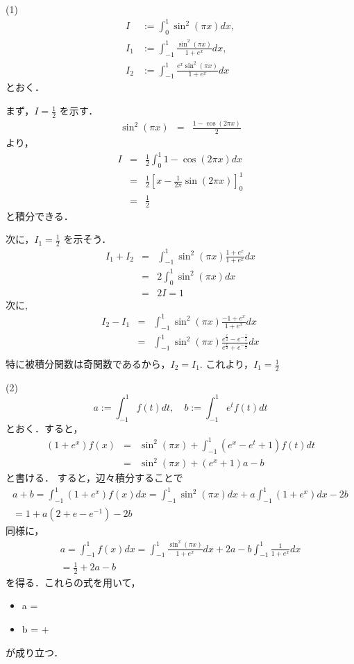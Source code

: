 \documentclass[main]{subfiles}
\begin{document}
\begin{pf}
(1) 
\begin{eqnarray*}
I &:= \int^1_0\sin^2(\pi x) dx, \\
I_1 &:= \int^1_{-1}\frac{\sin^2(\pi x)}{1+e^x}dx, \\
I_2 &:= \int^1_{-1}\frac{e^x\sin^2(\pi x)}{1+e^x}dx
\end{eqnarray*}
とおく．

まず，$I = \frac{1}{2}$ を示す．
\begin{eqnarray*}
\sin^2(\pi x) &=& \frac{1-\cos(2\pi x)}{2}
\end{eqnarray*}
より，
\begin{eqnarray*}
I &=& \frac{1}{2}\int^1_0 1-\cos(2\pi x)dx \\
	&=& \frac{1}{2}[x-\frac{1}{2\pi}\sin(2\pi x)]^1_0 \\
	&=& \frac{1}{2}
\end{eqnarray*}
と積分できる．

次に，$I_1 = \frac{1}{2}$ を示そう．
\begin{eqnarray*}
I_1 + I_2 &=& \int^1_{-1}\sin^2(\pi x) \frac{1+e^x}{1+e^x}dx \\
			&=& 2\int^1_0\sin^2(\pi x)dx \\
			&=& 2I = 1
\end{eqnarray*}
次に, 
\begin{eqnarray*}
I_2 -I_1 &=& \int^1_{-1}\sin^2(\pi x) \frac{-1+e^x}{1+e^x}dx \\
&=& \int^1_{-1}\sin^2(\pi x) 
					\frac{e^\frac{x}{2}-e^{-\frac{x}{2}}}{e^\frac{x}{2}+e^{-\frac{x}{2}}}dx \\
\end{eqnarray*}
特に被積分関数は奇関数であるから，$I_2 = I_1$. これより，$I_1 =\frac{1}{2}$

(2)
\begin{equation*}
a := \int^1_{-1}f(t)dt, \quad b := \int^1_{-1}e^tf(t)dt
\end{equation*}
とおく．すると，
\begin{eqnarray*}
(1+e^x)f(x) &=& \sin^2(\pi x)+\int^1_{-1}(e^x-e^t+1)f(t)dt \\
&=&\sin^2(\pi x)+(e^x+1)a - b
\end{eqnarray*}
と書ける．
すると，辺々積分することで
\begin{eqnarray*}
a + b = \int^1_{-1}(1+e^x)f(x)dx = \int^1_{-1}\sin^2(\pi x)dx 
											+ a \int^1_{-1}(1+e^x)dx -2b \\
= 1 + a(2 + e -e^{-1}) -2b
\end{eqnarray*}
同様に，
\begin{eqnarray*}
a = \int^1_{-1}f(x)dx = \int^1_{-1}\frac{\sin^2(\pi x)}{1+e^x}dx
									+ 2a -b\int^1_{-1}\frac{1}{1+e^x}dx \\
									= \frac{1}{2} + 2a - b
\end{eqnarray*}
を得る．これらの式を用いて，
\begin{itemize}
\item a =  \\
\item b =  + 
\end{itemize}
が成り立つ．
\end{pf}
\begin{prob}

\end{prob}
\begin{pf}

\end{pf}
\end{document}
